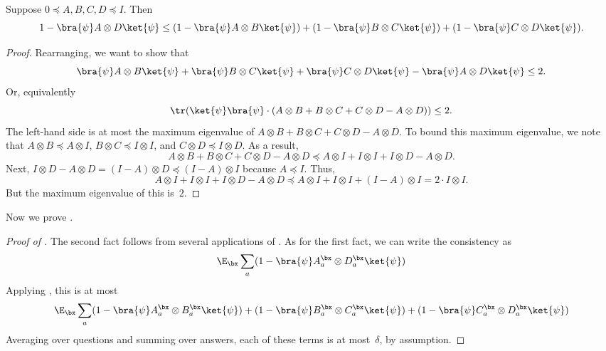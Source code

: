 \documentclass[11pt]{article}
\begin{document}
\begin{fact}\label{fact:fun-matrix-fact}
Suppose $0 \preceq A, B, C, D \preceq I$.  Then
\begin{equation*}
1- \bra{\psi} A \otimes D \ket{\psi}
\leq (1 - \bra{\psi} A \otimes B \ket{\psi}) + (1 - \bra{\psi} B \otimes C \ket{\psi}) + (1 - \bra{\psi} C \otimes D \ket{\psi}).
\end{equation*}
\end{fact}
\begin{proof}
Rearranging, we want to show that
\begin{equation*}
\bra{\psi} A \otimes B \ket{\psi} + \bra{\psi} B \otimes C \ket{\psi} + \bra{\psi} C \otimes D \ket{\psi} - \bra{\psi} A \otimes D \ket{\psi}
\leq 2.
\end{equation*}
Or, equivalently
\begin{equation*}
\tr(\ket{\psi}\bra{\psi} \cdot (A \otimes B + B \otimes C + C \otimes D - A \otimes D)) \leq 2.
\end{equation*}
The left-hand side is at most the maximum eigenvalue of $A \otimes B + B \otimes C + C \otimes D - A \otimes D$.
To bound this maximum eigenvalue, we note that $A \otimes B \preceq A \otimes I$, $B \otimes C \preceq I \otimes I$, and $C \otimes D \preceq I \otimes D$.
As a result, 
\begin{equation*}
A \otimes B + B \otimes C + C \otimes D - A \otimes D
\preceq A \otimes I + I \otimes I + I \otimes D - A \otimes D.
\end{equation*}
Next, $I \otimes D - A \otimes D = (I - A) \otimes D \preceq (I-A) \otimes I$ because $A \preceq I$.
Thus,
\begin{equation*}
A \otimes I + I \otimes I + I \otimes D - A \otimes D
\preceq A \otimes I + I \otimes I  + (I-A) \otimes I = 2 \cdot I \otimes I.
\end{equation*}
But the maximum eigenvalue of this is~$2$.
\end{proof}


Now we prove .
\begin{proof}[Proof of ]
The second fact follows from several applications of .
As for the first fact, we can write the consistency as
\begin{equation*}
\E_\bx \sum_a ( 1- \bra{\psi} A^{\bx}_a \otimes D^{\bx}_a \ket{\psi})
\end{equation*}
Applying , this is at most
\begin{equation*}
\E_\bx \sum_a (1 - \bra{\psi} A^\bx_a \otimes B^\bx_a \ket{\psi}) + (1 - \bra{\psi} B^\bx_a \otimes C^\bx_a \ket{\psi}) + (1 - \bra{\psi} C^\bx_a \otimes D^\bx_a \ket{\psi})
\end{equation*}
Averaging over questions and summing over answers, each of these terms is at most~$\delta$, by assumption.
\end{proof}
\end{document}
